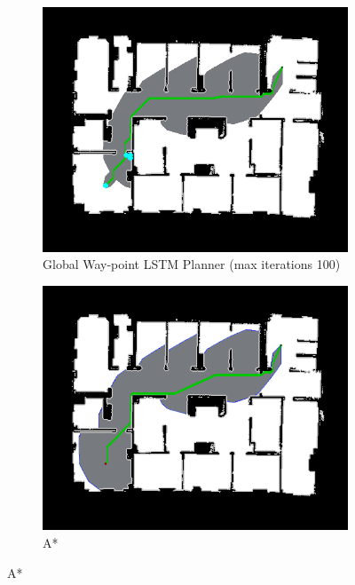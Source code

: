 \begin{figure}[]
  \centering
  \begin{subfigure}[b]{0.40\linewidth}
    \includegraphics[width=\linewidth]{images/screenshot_144.png}
     \caption{Global Way-point LSTM Planner (max iterations 100)}
  \end{subfigure}
  \hfill
  \begin{subfigure}[b]{0.40\linewidth}
    \includegraphics[width=\linewidth]{images/screenshot_124.png}
     \caption{A*\newline}
  \end{subfigure}
  \hfill

\end{figure}
